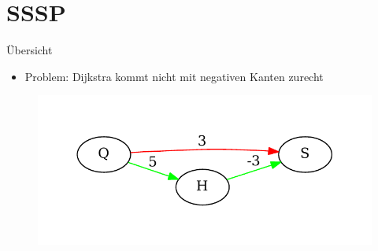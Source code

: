 \section{SSSP}

\begin{frame}{Übersicht}

\begin{itemize}
\itemsep1pt\parskip0pt
\item
  Problem: Dijkstra kommt nicht mit negativen Kanten zurecht
\end{itemize}

\begin{figure}[htbp]
\centering
\includegraphics[width=\linewidth]{dijkstra_gegenbeispiel.pdf}
\end{figure}

\end{frame}

